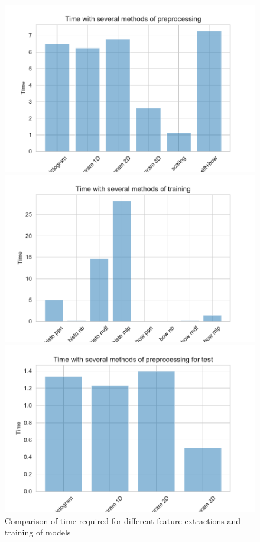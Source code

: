 \documentclass[11pt]{article}
\begin{document}
\begin{figure}[H]
\begin{minipage}[c]{0.3\textwidth}
\includegraphics[width=1\linewidth]{figures/Cifar/time_prepro.pdf}
\end{minipage}
\begin{minipage}[c]{0.3\textwidth}
\includegraphics[width=1\linewidth]{figures/Cifar/time_training.pdf}
\end{minipage}
\begin{minipage}[c]{0.3\textwidth}
\includegraphics[width=1\linewidth]{figures/Cifar/time_training_test.pdf}
\end{minipage}
\caption{Comparison of time required for different feature extractions and training of models}
\label{Cifar_time_comparison}
\end{figure}
\end{document}
